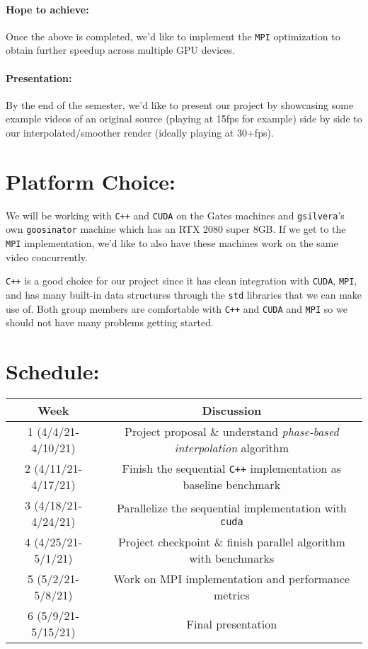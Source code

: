 \documentclass[12pt]{article}
\begin{document}
\paragraph{Hope to achieve:}
\par Once the above is completed, we'd like to implement the \texttt{MPI} optimization to obtain further speedup across multiple GPU devices. 
\paragraph{Presentation:}
\par By the end of the semester, we'd like to present our project by showcasing some example videos of an original source (playing at 15fps for example) side by side to our interpolated/smoother render (ideally playing at 30+fps).

\section*{Platform Choice:}
\par We will be working with \texttt{C++} and \texttt{CUDA} on the Gates machines and \texttt{gsilvera}'s own \texttt{goosinator} machine which has an RTX 2080 super 8GB. If we get to the \texttt{MPI} implementation, we'd like to also have these machines work on the same video concurrently. 
\par \texttt{C++} is a good choice for our project since it has clean integration with \texttt{CUDA}, \texttt{MPI}, and has many built-in data structures through the \texttt{std} libraries that we can make use of. Both group members are comfortable with \texttt{C++} and \texttt{CUDA} and \texttt{MPI} so we should not have many problems getting started.  

\section*{Schedule:}

\begin{center}
	\begin{tabular}{ |c|c| } 
		\hline
		Week & Discussion \\
		\hline
		1 (4/4/21-4/10/21) & Project proposal \& understand \textit{phase-based interpolation} algorithm \\ 
		\hline
		2 (4/11/21-4/17/21) & Finish the sequential \texttt{C++} implementation as baseline benchmark\\
		\hline
		3 (4/18/21-4/24/21) & Parallelize the sequential implementation with \texttt{cuda}\\
		\hline
		4 (4/25/21-5/1/21) & Project checkpoint \& finish parallel algorithm with benchmarks\\
		\hline
		5 (5/2/21-5/8/21) & Work on MPI implementation and performance metrics\\
		\hline
		6 (5/9/21-5/15/21) & Final presentation \\
		\hline
	\end{tabular}\\
\end{center}
\end{document}
